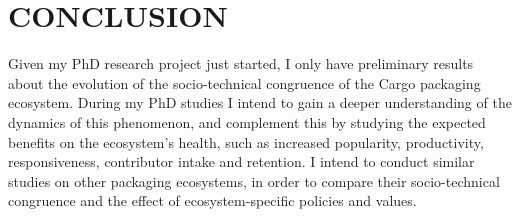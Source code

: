 \section{CONCLUSION}

Given my PhD research project just started, I only have preliminary results about the evolution of the socio-technical congruence of the Cargo packaging ecosystem.
During my PhD studies I intend to gain a deeper understanding of the dynamics of this phenomenon, and complement this by studying the expected benefits on the ecosystem's health, such as increased popularity, productivity, responsiveness, contributor intake and retention.
I intend to conduct similar studies on other packaging ecosystems, in order to compare their socio-technical congruence and the effect of ecosystem-specific policies and values.
